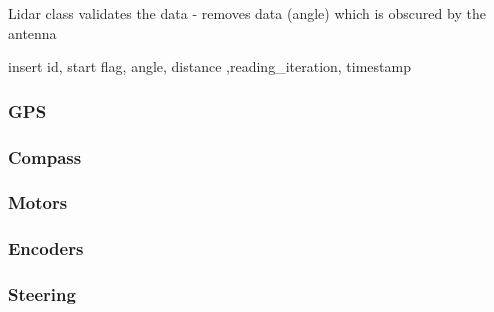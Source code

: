 Lidar class validates the data
 - removes data (angle) which is obscured by the antenna

 insert id, start flag, angle, distance ,reading_iteration, timestamp

\subsubsection{GPS}

\subsubsection{Compass}

\subsubsection{Motors}

\subsubsection{Encoders}

\subsubsection{Steering}
